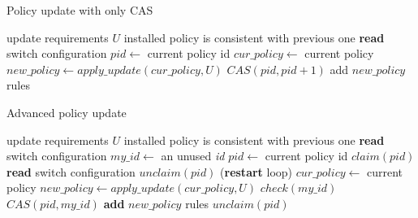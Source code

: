 \documentclass[conference]{sigcomm-alternate}
\begin{document}
\begin{algorithm}[t]
    \caption{Policy update with only CAS}
    \label{alg:simple-update}
    \begin{algorithmic}[1]
    \Require update requirements $U$
    \Ensure installed policy is consistent with previous one
 		\Repeat
 			\State \textbf{read} switch configuration
 			\State $pid\gets$ current policy id 
 			\State $cur\_policy\gets$ current policy
 			\State $new\_policy\gets apply\_update(cur\_policy,U)$
 			\startTxn
	 			\State $CAS(pid,pid+1)$
	 			\State add $new\_policy$ rules %
 			\endTxn
			\Return

    \end{algorithmic}
\end{algorithm}



\begin{algorithm}[t]
    \caption{Advanced policy update}
    \label{alg:update}
    \begin{algorithmic}[1]
    \Require update requirements $U$
    \Ensure installed policy is consistent with previous one
 		\Repeat
 			\State \textbf{read} switch configuration
 			\State $my\_id\gets$ an unused \emph{id} 
 			\State $pid\gets$ current policy id 
 			\State $claim(pid)$
 			\State \textbf{read} switch configuration
	 			\State $unclaim(pid)$
 				 (\textbf{restart} loop)
 			\EndIf
 			\State $cur\_policy\gets$ current policy
 			\State $new\_policy\gets apply\_update(cur\_policy,U)$
 			\startTxn
 				\State $check(my\_id)$
	 			\State $CAS(pid,my\_id)$
	 			\State \textbf{add} $new\_policy$ rules %
 			\endTxn
	 		\State $unclaim(pid)$
			\Return

    \end{algorithmic}
\end{algorithm}
\end{document}
